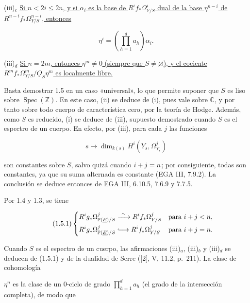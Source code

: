 \noindent(iii)$_c$ \underline{Si $n<2i\leq2n$, y si $\alpha_i$ es la base
de $R^if_*\Omega^i_{Y/S}$ dual de la base $\eta^{n-i}$ de
$R^{n-i}f_*\Omega^{n-i}_{Y/S}$, entonces}

\begin{equation*}
\eta^i=\left(\prod_{h=1}^d a_h\right)\alpha_i.
\end{equation*}

\noindent(iii)$_d$ \underline{Si $n=2m$, entonces $\eta^m\ne0$ (siempre
que $S\ne\varnothing$), y el cociente
$R^mf_*\Omega^m_{Y/S}/\underline O_S\eta^m$ es localmente libre.}

Basta demostrar 1.5 en un caso «universal», lo que permite suponer que $S$
es liso sobre $\operatorname{Spec}(\mathbb Z)$. En este caso, (ii) se
deduce de (i), pues vale sobre $\mathbb C$, y por tanto sobre todo cuerpo de
característica cero, por la teoría de Hodge. Además, como $S$ es reducido,
(i) se deduce de (iii), supuesto demostrado cuando $S$ es el espectro de un
cuerpo. En efecto, por (iii), para cada $j$ las funciones

\begin{equation*}
s\longmapsto\dim_{k(s)}H^i(Y_s,\Omega^j_{Y_s})
\end{equation*}

son constantes sobre $S$, salvo quizá cuando $\sisi{i=j}{i+j=n}$; por consiguiente, todas
son constantes, ya que su suma alternada es constante (EGA III, 7.9.2). La
conclusión se deduce entonces de EGA III, 6.10.5, 7.6.9 y 7.7.5.

Por 1.4 y 1.3, se tiene

\begin{equation}\tag{1.5.1}
\left\{
\begin{aligned}
R^ig_*\Omega^j_{\mathbb P(\underline E)/S}
&\xrightarrow{\ \sim\ }R^if_*\Omega^j_{Y/S}
&&\text{para }i+j<n,\\
R^ig_*\Omega^j_{\mathbb P(\underline E)/S}
&\lhook\joinrel\longrightarrow R^if_*\Omega^j_{Y/S}
&&\text{para }i+j=n.
\end{aligned}
\right.
\end{equation}

Cuando $S$ es el espectro de un cuerpo, las afirmaciones (iii)$_a$,
(iii)$_b$ y (iii)$_d$ se deducen de (1.5.1) y de la dualidad de Serre
([2], V, 11.2, p.~211). La clase de cohomología

\pageoriginale

$\eta^n$ es la clase de un $0$-ciclo de grado
$\prod_{h=1}^d a_h$ (el grado de la intersección completa), de modo que

